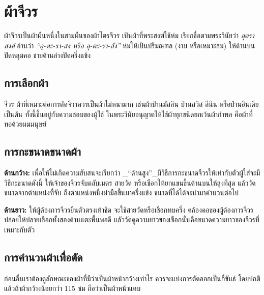 \chapter{ผ้าจีวร}

ผ้าจีวรเป็นผ้าผืนหนึ่งในสามผืนของผ้าไตรจีวร เป้นผ้าที่พระสงฆ์ใช้ห่ม
เรียกชื่อตามพระวินัยว่า \emph{อุตราสงค์} อ่านว่า \emph{``อุ-ตะ-รา-สง
หรือ อุ-ตะ-รา-สัง''} ห่มให้เป้นปริมณฑล (งาม หรือเหมาะสม)
ให้ด้านบนปิดหลุมคอ ชายด้านล่างปิดครึ่งแข้ง

\section{การเลือกผ้า}

จีวร ผ้าที่เหมาะต่อการตัดจีวรควรเป็นผ้าไม่หนามาก เช่นผ้าป่านมัสลิน
ป่านสวิส ลีนิน หรือป่านอินเดียเป็นต้น ทั้งนี้ขึ้นอยู่กับความชอบของผู้ใช้
ในพระวินัยอนุญาตให้ใช้ผ้าทุกขนิดยกเว้นผ้ากำพล คือผ้าที่ทอด้วยผมมนุษย์



\section{การกะขนาดขนาดผ้า}

\textbf{ด้านกว้าง:} เพื่อให้ไม่เกิดความสับสนจะเรียกว่า
\_``ด้านสูง''\_มีวิธีการกะขนาดจีวรให้เท่ากับตัวผู้ใส่จะมีวิธีกะขนาดดังนี้
ให้เจ้าของจีวรจับตลับเมตร สายวัด หรือเชือกให้ยกแขนขึ้นด้านบนให้สูงทีสุด
แล้ววัดขนาดจากตำแหน่งที่จับ ถึงตำแหน่งหนึ่งผ่ามือขึ้นมาครึ่งแข้ง
ขนาดที่ได้ได้จะนำมาคำนวนต่อไป



\textbf{ด้านยาว:} ให้ผู้ต้องการจีวรยืนตัวตรงเท้าชิด
จะใช้สายวัดหรือเชือกทบครึ่ง คล้องคอของผู้ต้องการจีวร
ปล่อยให้ปลายเชือกทั้งสองด้านแตะพื้นพอดี
แลัววัดดูความยาวของเชือกนั่นคือขนาดความยาวของจีวรที่เหมาะกับตัว



\section{การคำนวนผ้าเพื่อตัด}

ก่อนอื่นเราต้องดูลักษณะของผ้าที่มีว่าเป็นผ้าหน้ากว้างเท่าไร
ควรจะแบ่งการตัดออกเป็นกี่ขันธ์ โดยปกติแล้วถ้าผ้ากว้างน้อยกว่า 115 ซม
ถือว่าเป็นผ้าหน้าแคบ

